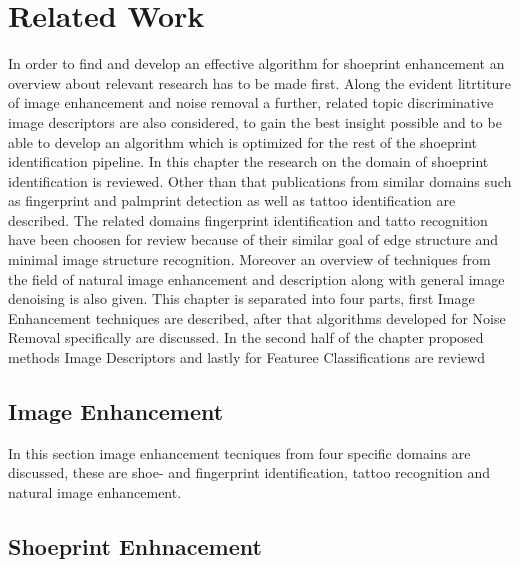 \documentclass[draft,final]{vutinfth} %
\begin{document}
\chapter{Related Work}
\par
In order to find and develop an effective algorithm for shoeprint enhancement an overview about relevant research has to be made first.
Along the evident litrtiture of image enhancement and noise removal a further, related topic discriminative image descriptors are also considered, to gain the best insight possible and to be able to develop an algorithm which is optimized for the rest of the shoeprint identification pipeline.
In this chapter the research on the domain of shoeprint identification is reviewed.
Other than that publications from similar domains such as fingerprint and palmprint detection as well as tattoo identification are described.
The related domains fingerprint identification and tatto recognition have been choosen for review because of their similar goal of edge structure and minimal image structure recognition.
Moreover an overview of techniques from the field of natural image enhancement and description along with general image denoising is also given.
This chapter is separated into four parts, first Image Enhancement techniques are described, after that algorithms developed for Noise Removal specifically are discussed.
In the second half of the chapter proposed methods Image Descriptors and lastly for Featuree Classifications are reviewd

\section{Image Enhancement}
\label{sec:rw:ImageENhancement}

In this section image enhancement tecniques from four specific domains are discussed, these are shoe- and fingerprint identification, tattoo recognition and natural image enhancement.

\section*{Shoeprint Enhnacement}
\end{document}
